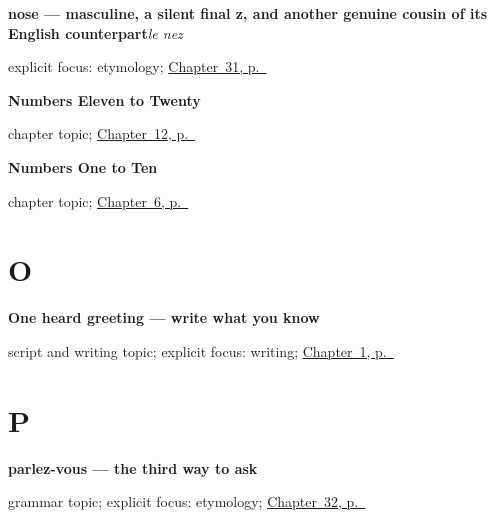 \noindent\begin{minipage}[t]{\linewidth}
\raggedright
\textbf{nose — masculine, a silent final z, and another genuine cousin of its English counterpart}\enspace\emph{le nez}\par
\footnotesize explicit focus: etymology; \hyperref[ch:fr-eyes-nose-mouth-stomach]{Chapter~31, p.~\pageref*{ch:fr-eyes-nose-mouth-stomach}}
\end{minipage}\par\smallskip

\noindent\begin{minipage}[t]{\linewidth}
\raggedright
\textbf{Numbers Eleven to Twenty}\par
\footnotesize chapter topic; \hyperref[ch:numbers-11-20]{Chapter~12, p.~\pageref*{ch:numbers-11-20}}
\end{minipage}\par\smallskip

\noindent\begin{minipage}[t]{\linewidth}
\raggedright
\textbf{Numbers One to Ten}\par
\footnotesize chapter topic; \hyperref[ch:numbers-1-10]{Chapter~6, p.~\pageref*{ch:numbers-1-10}}
\end{minipage}\par\smallskip

\section*{O}

\noindent\begin{minipage}[t]{\linewidth}
\raggedright
\textbf{One heard greeting — write what you know}\par
\footnotesize script and writing topic; explicit focus: writing; \hyperref[ch:greetings]{Chapter~1, p.~\pageref*{ch:greetings}}
\end{minipage}\par\smallskip

\section*{P}

\noindent\begin{minipage}[t]{\linewidth}
\raggedright
\textbf{parlez-vous — the third way to ask}\par
\footnotesize grammar topic; explicit focus: etymology; \hyperref[ch:fr-questions]{Chapter~32, p.~\pageref*{ch:fr-questions}}
\end{minipage}\par\smallskip

